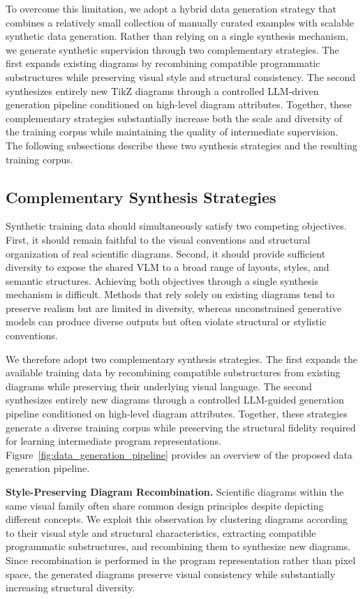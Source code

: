 \documentclass{article} %
\begin{document}
To overcome this limitation, we adopt a hybrid data generation strategy that combines a relatively small collection of manually curated examples with scalable synthetic data generation. Rather than relying on a single synthesis mechanism, we generate synthetic supervision through two complementary strategies. The first expands existing diagrams by recombining compatible programmatic substructures while preserving visual style and structural consistency. The second synthesizes entirely new TikZ diagrams through a controlled LLM-driven generation pipeline conditioned on high-level diagram attributes. Together, these complementary strategies substantially increase both the scale and diversity of the training corpus while maintaining the quality of intermediate supervision. The following subsections describe these two synthesis strategies and the resulting training corpus.

\subsection{Complementary Synthesis Strategies}

Synthetic training data should simultaneously satisfy two competing objectives. First, it should remain faithful to the visual conventions and structural organization of real scientific diagrams. Second, it should provide sufficient diversity to expose the shared VLM to a broad range of layouts, styles, and semantic structures. Achieving both objectives through a single synthesis mechanism is difficult. Methods that rely solely on existing diagrams tend to preserve realism but are limited in diversity, whereas unconstrained generative models can produce diverse outputs but often violate structural or stylistic conventions.

We therefore adopt two complementary synthesis strategies. The first expands the available training data by recombining compatible substructures from existing diagrams while preserving their underlying visual language. The second synthesizes entirely new diagrams through a controlled LLM-guided generation pipeline conditioned on high-level diagram attributes. Together, these strategies generate a diverse training corpus while preserving the structural fidelity required for learning intermediate program representations. Figure~\ref{fig:data_generation_pipeline} provides an overview of the proposed data generation pipeline.

\noindent\textbf{Style-Preserving Diagram Recombination.}
Scientific diagrams within the same visual family often share common design principles despite depicting different concepts. We exploit this observation by clustering diagrams according to their visual style and structural characteristics, extracting compatible programmatic substructures, and recombining them to synthesize new diagrams. Since recombination is performed in the program representation rather than pixel space, the generated diagrams preserve visual consistency while substantially increasing structural diversity.
\end{document}
